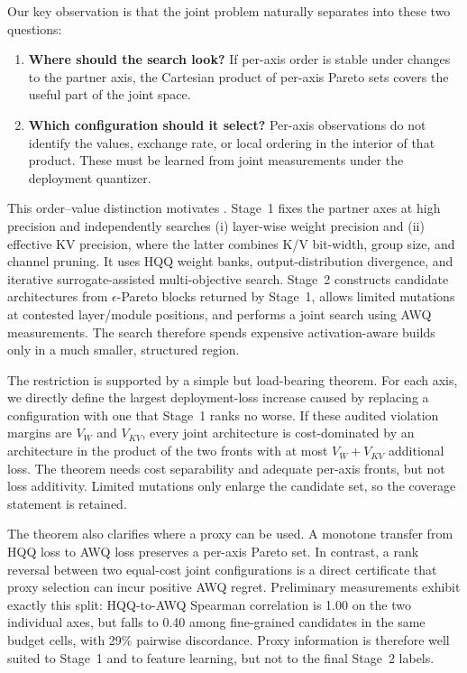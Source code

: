 Our key observation is that the joint problem naturally separates into these
two questions:

\begin{enumerate}[leftmargin=*,itemsep=2pt]
    \item \textbf{Where should the search look?}  If per-axis order is stable
    under changes to the partner axis, the Cartesian product of per-axis Pareto
    sets covers the useful part of the joint space.
    \item \textbf{Which configuration should it select?}  Per-axis observations
    do not identify the values, exchange rate, or local ordering in the interior
    of that product.  These must be learned from joint measurements under the
    deployment quantizer.
\end{enumerate}

This order--value distinction motivates \method.  Stage~1 fixes the partner axes
at high precision and independently searches (i) layer-wise weight precision and
(ii) effective KV precision, where the latter combines K/V bit-width, group size,
and channel pruning.  It uses HQQ weight banks, output-distribution divergence,
and iterative surrogate-assisted multi-objective search.  Stage~2 constructs
candidate architectures from $\epsilon$-Pareto blocks returned by Stage~1,
allows limited mutations at contested layer/module positions, and performs a
joint search using AWQ measurements.  The search therefore spends expensive
activation-aware builds only in a much smaller, structured region.

The restriction is supported by a simple but load-bearing theorem.  For each
axis, we directly define the largest deployment-loss increase caused by replacing
a configuration with one that Stage~1 ranks no worse.  If these audited violation
margins are $V_W$ and $V_{KV}$, every joint architecture is cost-dominated by an
architecture in the product of the two fronts with at most
$V_W+V_{KV}$ additional loss.  The theorem needs cost separability and adequate
per-axis fronts, but not loss additivity.  Limited mutations only enlarge the
candidate set, so the coverage statement is retained.

The theorem also clarifies where a proxy can be used.  A monotone transfer from
HQQ loss to AWQ loss preserves a per-axis Pareto set.  In contrast, a rank
reversal between two equal-cost joint configurations is a direct certificate
that proxy selection can incur positive AWQ regret.  Preliminary measurements
exhibit exactly this split: HQQ-to-AWQ Spearman correlation is 1.00 on the two
individual axes, but falls to 0.40 among fine-grained candidates in the same
budget cells, with 29\% pairwise discordance.  Proxy information is therefore
well suited to Stage~1 and to feature learning, but not to the final Stage~2
labels.

